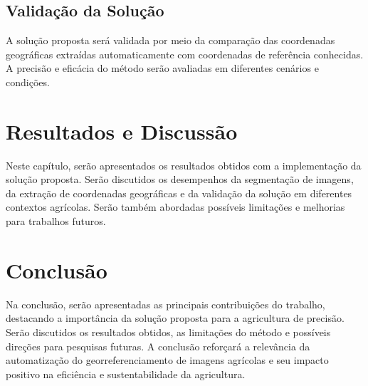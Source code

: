 \documentclass[conference]{IEEEtran}
\begin{document}

\subsection{Validação da Solução}
A solução proposta será validada por meio da comparação das coordenadas geográficas extraídas 
automaticamente com coordenadas de referência conhecidas. A precisão e eficácia do método serão 
avaliadas em diferentes cenários e condições.

\section{Resultados e Discussão}
Neste capítulo, serão apresentados os resultados obtidos com a implementação da solução proposta. 
Serão discutidos os desempenhos da segmentação de imagens, da extração de coordenadas 
geográficas e da validação da solução em diferentes contextos agrícolas. 
Serão também abordadas possíveis limitações e melhorias para trabalhos futuros.

\section{Conclusão}
Na conclusão, serão apresentadas as principais contribuições do trabalho, destacando a 
importância da solução proposta para a agricultura de precisão. Serão discutidos os resultados 
obtidos, as limitações do método e possíveis direções para pesquisas futuras.
A conclusão reforçará a relevância da automatização do georreferenciamento de imagens 
agrícolas e seu impacto positivo na eficiência e sustentabilidade da agricultura.



\end{document}
